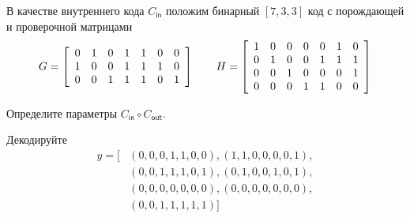 \documentclass[11pt]{exam}
\theoremstyle{definition}
\begin{document}
{\begin{questions}
	В качестве внутреннего кода $C_{\mathsf{in}}$ положим бинарный $[7,3,3]$ код с порождающей и проверочной матрицами
	\[
	G = \left[ \begin{array}{c c c c c c c}
	0&1&0&1&1&0&0 \\
	1&0&0&1&1&1&0 \\
	0&0&1&1&1&0&1 \\
	\end{array}
	\right] \quad \quad
	H = \left[ \begin{array}{c c c c c c c}
	1&0&0&0&0&1&0 \\
	0&1&0&0&1&1&1 \\
	0&0&1&0&0&0&1 \\
	0&0&0&1&1&0&0 \\
	\end{array}
	\right]
	\]
	
	Определите параметры $C_{\mathsf{in}} \circ C_{\mathsf{out}}$.
	\question
	
	Декодируйте
	\begin{align*}
		y = [&(0, 0, 0, 1, 1, 0, 0), (1, 1, 0, 0, 0, 0, 1), \\
		&(0, 0, 1, 1, 1, 0, 1), (0, 1, 0, 0, 1, 0, 1), \\
		&(0, 0, 0, 0, 0, 0, 0), (0, 0, 0, 0, 0, 0, 0), \\
		&(0, 0, 1, 1, 1, 1, 1)]
	\end{align*}
	

\end{questions}}
\end{document}
